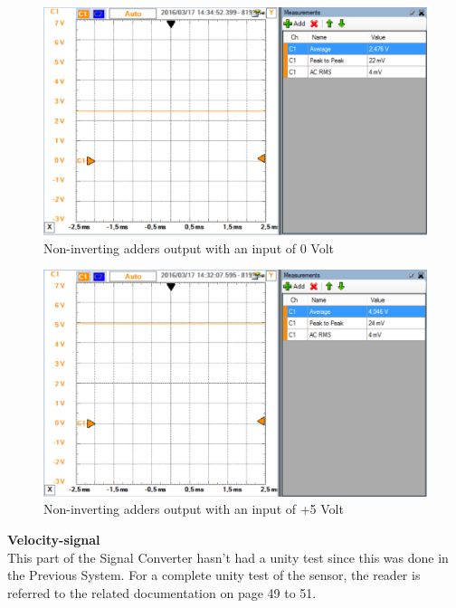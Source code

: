 \begin{figure}[H]
	\centering
	\includegraphics[width=0.9\linewidth]{Hardware/SignalConverter/Torque_test2}
	\caption{Non-inverting adders output with an input of 0 Volt}
	\label{fig:TorqueTest2}
\end{figure}

\begin{figure}[H]
	\centering
	\includegraphics[width=0.9\linewidth]{Hardware/SignalConverter/Torque_test3}
	\caption{Non-inverting adders output with an input of +5 Volt}
	\label{fig:TorqueTest3}
\end{figure}

\textbf{Velocity-signal}\\
This part of the Signal Converter hasn't had a unity test since this was done in the Previous System\cite{BAC_rullefelt}. For a complete unity test of the sensor, the reader is referred to the related documentation on page 49 to 51.